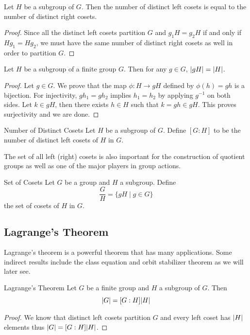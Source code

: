 \documentclass[a4paper]{article}
\begin{document}
\begin{prp}{}{} Let $H$ be a subgroup of $G$. Then the number of distinct left cosets is equal to the number of distinct right cosets. \tcbline
\begin{proof} Since all the distinct left cosets partition $G$ and $g_1H=g_2H$ if and only if $Hg_1=Hg_2$, we must have the same number of distinct right cosets as well in order to partition $G$. 
\end{proof}
\end{prp}

\begin{prp}{}{} Let $H$ be a subgroup of a finite group $G$. Then for any $g\in G$, $\abs{gH}=\abs{H}$. \tcbline
\begin{proof} Let $g\in G$. We prove that the map $\phi:H\to gH$ defined by $\phi(h)=gh$ is a bijection. For injectivity, $gh_1=gh_2$ implies $h_1=h_2$ by applying $g^{-1}$ on both sides. Let $k\in gH$, then there exists $h\in H$ such that $k=gh\in gH$. This proves surjectivity and we are done. 
\end{proof}
\end{prp}

\begin{defn}{Number of Distinct Cosets}{} Let $H$ be a subgroup of $G$. Define $[G:H]$ to be the number of distinct left cosets of $H$ in $G$. 
\end{defn}

The set of all left (right) cosets is also important for the construction of quotient groups as well as one of the major players in group actions. 

\begin{defn}{Set of Cosets}{} Let $G$ be a group and $H$ a subgroup. Define $$\frac{G}{H}=\{gH\;|\;g\in G\}$$ the set of cosets of $H$ in $G$. 
\end{defn}

\subsection{Lagrange's Theorem}
Lagrange's theorem is a powerful theorem that has many applications. Some indirect results include the class equation and orbit stabilizer theorem as we will later see. 

\begin{thm}{Lagrange's Theorem}{} Let $G$ be a finite group and $H$ a subgroup of $G$. Then $$\abs{G}=[G:H]\abs{H}$$ \tcbline
\begin{proof} We know that distinct left cosets partition $G$ and every left coset has $\abs{H}$ elements thus $\abs{G}=[G:H]\abs{H}$. 
\end{proof}
\end{thm}
\end{document}
